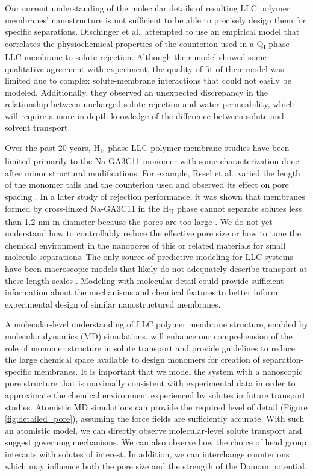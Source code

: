 \documentclass[journal=jpcbfk,manuscript=article]{achemso}
\begin{document}
  Our current understanding of the molecular details of resulting LLC polymer membranes'
  nanostructure is not sufficient to be able to precisely design them for
  specific separations. Dischinger et al.~attempted to use an empirical model
  that correlates the physiochemical properties of the counterion used in a 
  Q\textsubscript{I}-phase LLC membrane to solute rejection\cite{dischinger_effect_2017}.
  Although their model showed some qualitative agreement with experiment, the
  quality of fit of their model was limited due to complex solute-membrane 
  interactions that could not easily be modeled. Additionally, they observed
  an unexpected discrepancy in the relationship between uncharged solute
  rejection and water permeability, which will require a more in-depth knowledge of
  the difference between solute and solvent transport.
  
  Over the past 20 years, H\textsubscript{II}-phase LLC polymer membrane
  studies have been limited primarily to the Na-GA3C11 monomer with some
  characterization done after minor structural modifications. For example, Resel
  et al.~varied the length of the monomer tails and the counterion used and
  observed its effect on pore spacing \cite{resel_structural_2000}. In a later
  study of rejection performance, it was shown that membranes formed by
  cross-linked Na-GA3C11 in the H\textsubscript{II} phase cannot separate solutes
  less than 1.2 nm in diameter because the pores are too large
  \cite{zhou_supported_2005}. We do not yet understand how to controllably reduce
  the effective pore size or how to tune the chemical environment in the
  nanopores of this or related materials for small molecule separations. The only
  source of predictive modeling for LLC systems have been macroscopic models that
  likely do not adequately describe transport at these length scales
  \cite{hatakeyama_water_2011}. Modeling with molecular detail could provide
  sufficient information about the mechanisms and chemical features to better
  inform experimental design of similar nanostructured membranes. 

  A molecular-level understanding of LLC polymer membrane structure, enabled by
  molecular dynamics (MD) simulations, will enhance our comprehension of the role
  of monomer structure in solute transport and provide guidelines to reduce the
  large chemical space available to design monomers for creation of
  separation-specific membranes. It is important that we model the system with a
  nanoscopic pore structure that is maximally consistent with experimental data
  in order to approximate the chemical environment experienced by solutes in 
  future transport studies. Atomistic MD simulations can provide the required
  level of detail (Figure \ref{fig:detailed_pore}), assuming the force fields are
  sufficiently accurate. With such an atomistic model, we can directly observe
  molecular-level solute transport and suggest governing mechanisms. We can also
  observe how the choice of head group interacts with solutes of interest. In
  addition, we can interchange counterions which may influence both the pore size
  and the strength of the Donnan potential. 
\end{document}
